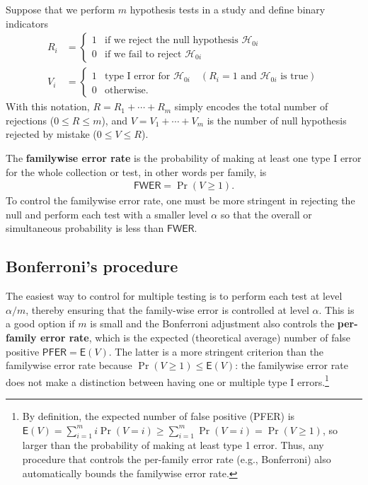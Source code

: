 \documentclass[
  11pt,
  letterpaper,
]{scrbook}
\theoremstyle{definition}
\theoremstyle{definition}
\theoremstyle{remark}
\begin{document}
Suppose that we perform \(m\) hypothesis tests in a study and define
binary indicators \begin{align}
R_i &= \begin{cases} 1 & \text{if we reject the null hypothesis }  \mathscr{H}_{0i} \\
0 & \text{if we fail to reject } \mathscr{H}_{0i}
\end{cases}\\
V_i &=\begin{cases} 1 & \text{type I error for } \mathscr{H}_{0i}\quad  (R_i=1 \text{ and  }\mathscr{H}_{0i} \text{ is true}) \\ 0 & \text{otherwise}.
\end{cases}
\end{align} With this notation, \(R=R_1 + \cdots + R_m\) simply encodes
the total number of rejections (\(0 \leq R \leq m\)), and
\(V = V_1 + \cdots + V_m\) is the number of null hypothesis rejected by
mistake (\(0 \leq V \leq R\)).

The \textbf{familywise error rate} is the probability of making at least
one type I error for the whole collection or test, in other words per
family, is \begin{align*}
\mathsf{FWER} = \Pr(V \geq 1).
\end{align*} To control the familywise error rate, one must be more
stringent in rejecting the null and perform each test with a smaller
level \(\alpha\) so that the overall or simultaneous probability is less
than \(\mathsf{FWER}\).

\subsection{Bonferroni's procedure}\label{bonferronis-procedure}

The easiest way to control for multiple testing is to perform each test
at level \(\alpha/m\), thereby ensuring that the family-wise error is
controlled at level \(\alpha\). This is a good option if \(m\) is small
and the Bonferroni adjustment also controls the \textbf{per-family error
rate}, which is the expected (theoretical average) number of false
positive \(\mathsf{PFER} = \mathsf{E}(V)\). The latter is a more
stringent criterion than the familywise error rate because
\(\Pr(V \geq 1) \leq \mathsf{E}(V)\): the familywise error rate does not
make a distinction between having one or multiple type I
errors.\footnote{By definition, the expected number of false positive
  (PFER) is
  \(\mathsf{E}(V) = \sum_{i=1}^m i \Pr(V=i) \geq \sum_{i=1}^m \Pr(V=i) = \Pr(V \geq 1)\),
  so larger than the probability of making at least type 1 error. Thus,
  any procedure that controls the per-family error rate (e.g.,
  Bonferroni) also automatically bounds the familywise error rate.}
\end{document}
